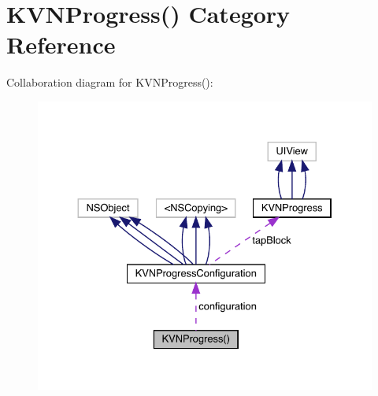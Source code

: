 \hypertarget{category_k_v_n_progress_07_08}{}\section{K\+V\+N\+Progress() Category Reference}
\label{category_k_v_n_progress_07_08}


Collaboration diagram for K\+V\+N\+Progress()\+:\nopagebreak
\begin{figure}[H]
\begin{center}
\leavevmode
\includegraphics[width=330pt]{category_k_v_n_progress_07_08__coll__graph}
\end{center}
\end{figure}
